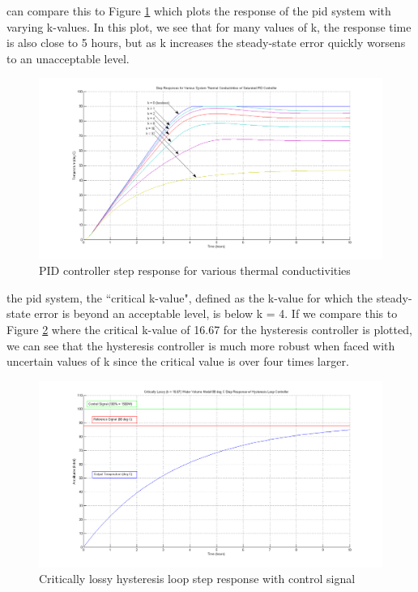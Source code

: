 \documentclass{article}
\begin{document}
 can compare this to Figure \ref{fig:pid-steps-various-k} which plots the response of the \gls{pid} system with varying k-values. In this plot, we see that for many values of k, the response time is also close to 5 hours, but as k increases the steady-state error quickly worsens to an unacceptable level.

\begin{figure}[H]
\begin{center}
\includegraphics[scale=0.30]{pid-steps-various-k.png}
\caption{PID controller step response for various thermal conductivities}
\label{fig:pid-steps-various-k}
\end{center}
\end{figure}

 the \gls{pid} system, the ``critical k-value", defined as the k-value for which the steady-state error is beyond an acceptable level, is below k = 4. If we compare this to Figure \ref{fig:hysteresis-step-critical} where the critical k-value of 16.67 for the hysteresis controller is plotted, we can see that the hysteresis controller is much more robust when faced with uncertain values of k since the critical value is over four times larger.

\begin{figure}[H]
\begin{center}
\includegraphics[scale=0.30]{hysteresis-step-critical.png}
\caption{Critically lossy hysteresis loop step response with control signal}
\label{fig:hysteresis-step-critical}
\end{center}
\end{figure}
\end{document}
